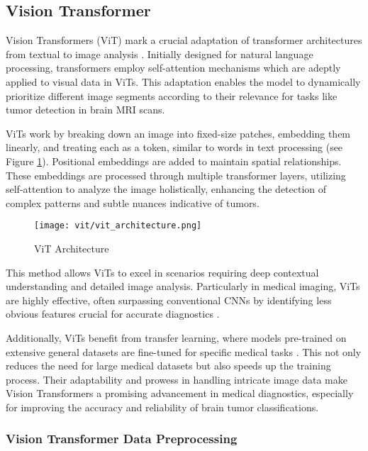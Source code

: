 \subsection{Vision Transformer}\label{s:vit}

Vision Transformers (ViT) mark a crucial adaptation of transformer architectures from textual to image analysis \cite{Khan2021Transformers}. Initially designed for natural language processing, transformers employ self-attention mechanisms which are adeptly applied to visual data in ViTs. This adaptation enables the model to dynamically prioritize different image segments according to their relevance for tasks like tumor detection in brain MRI scans.

ViTs work by breaking down an image into fixed-size patches, embedding them linearly, and treating each as a token, similar to words in text processing \cite{Wu2020Visual} (see Figure \ref{fig:vit_architecture}). Positional embeddings are added to maintain spatial relationships. These embeddings are processed through multiple transformer layers, utilizing self-attention to analyze the image holistically, enhancing the detection of complex patterns and subtle nuances indicative of tumors.

\begin{figure}[H]
  \centering
  \texttt{[image: vit/vit\_architecture.png]}
  \caption{ViT Architecture \cite{curroncol29100590}}
  \label{fig:vit_architecture}
\end{figure}

This method allows ViTs to excel in scenarios requiring deep contextual understanding and detailed image analysis. Particularly in medical imaging, ViTs are highly effective, often surpassing conventional CNNs by identifying less obvious features crucial for accurate diagnostics \cite{Matsoukas2021Is}.

Additionally, ViTs benefit from transfer learning, where models pre-trained on extensive general datasets are fine-tuned for specific medical tasks \cite{Simon2022Vision}. This not only reduces the need for large medical datasets but also speeds up the training process. Their adaptability and prowess in handling intricate image data make Vision Transformers a promising advancement in medical diagnostics, especially for improving the accuracy and reliability of brain tumor classifications.


\subsubsection{Vision Transformer Data Preprocessing}

